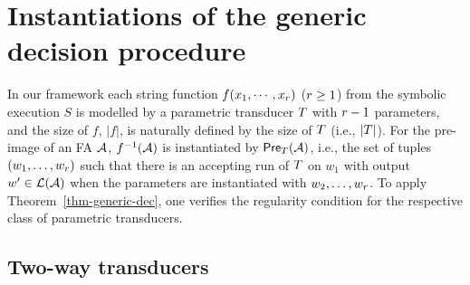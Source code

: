 
\vspace{-4mm}
\section{Instantiations of the generic decision procedure}\label{sec-instan}
\vspace{-2mm}

In our framework each string function $f(x_1, \cdots, x_r)$ ($r\geq 1$) from the symbolic execution $S$ is modelled by a parametric transducer $T$  
with $r-1$ parameters, and the size of $f$, $|f|$, is naturally defined by the size of $T$ (i.e., $|T|$). 
For the pre-image of an FA $\mathcal{A}$,  %
$f^{-1}(\mathcal{A})$ is instantiated by $\textsf{Pre}_{T}(\mathcal{A})$, i.e.,  the set of tuples $(w_1,\ldots, w_r)$ such that there is an accepting run of $T$ on $w_1$ with output $w'\in \mathcal{L}(\mathcal{A})$ when the parameters are instantiated with $w_2,\ldots, w_r$. To apply Theorem~\ref{thm-generic-dec}, one verifies the regularity condition \prerec{} for the respective class of parametric transducers. %



 
 \vspace{-3mm}
\subsection{Two-way transducers}\label{sec-2way}
 \vspace{-1mm}

